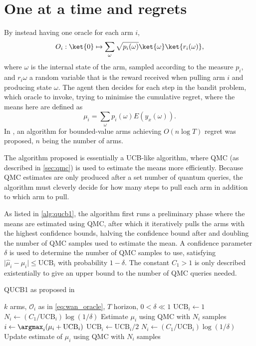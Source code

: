 \section{One at a time and regrets}
By instead having one oracle for each arm $i$,
\begin{equation}
    O_i: \ket{0} \mapsto \sum_\omega \sqrt{p_i(\omega)} \ket{\omega} \ket{r_i(\omega)},
    \label{eq:wan_oracle}
\end{equation}
where $\omega$ is the internal state of the arm, sampled according to the measure $p_i$, and $r_i{\omega}$ a random variable that is the reward received when pulling arm $i$ and producing state $\omega$.
The agent then decides for each step in the bandit problem, which oracle to invoke, trying to minimise the cumulative regret, where the means here are defined as
\begin{equation}
    \mu_i = \sum_\omega p_i(\omega) E(y_x(\omega)).
\end{equation}
In \cite{wan2022}, an algorithm for bounded-value arms achieving $O(n \log T)$ regret was proposed, $n$ being the number of arms.

The algorithm proposed is essentially a UCB-like algorithm, where QMC (as described in \cref{sec:qmc}) is used to estimate the means more efficiently.
Because QMC estimates are only produced after a set number of quantum queries, the algorithm must cleverly decide for how many steps to pull each arm in addition to which arm to pull.

As listed in \cref{alg:qucb1}, the algorithm first runs a preliminary phase where the means are estimated using QMC, after which it iteratively pulls the arms with the highest confidence bounds, halving the confidence bound after and doubling the number of QMC samples used to estimate the mean.
A confidence parameter $\delta$ is used to determine the number of QMC samples to use, satisfying $\lvert\hat{\mu}_i - \mu_i\rvert \leq \text{UCB}_i$ with probability $1-\delta$.
The constant $C_1>1$ is only described existentially to give an upper bound to the number of QMC queries needed.

\begin{algorithm}
    \caption{QUCB1 as proposed in \cite{wan2022}}
    \label{alg:qucb1}
    \begin{algorithmic}[1]
        \Require $k$ arms, $\mathcal{O}_i$ as in \cref{eq:wan_oracle}, $T$ horizon, $0 < \delta \ll 1$
        \State $\text{UCB}_i \gets 1$
        \State $N_i \gets (C_1/\text{UCB}_i) \log(1/\delta)$
        \State Estimate $\mu_i$ using QMC with $N_i$ samples
        \EndFor
        \State $i \gets \argmax_i (\mu_i + \text{UCB}_i)$
        \State $\text{UCB}_i \gets \text{UCB}_i /2$
        \State $N_i \gets (C_1/\text{UCB}_i) \log(1/\delta)$
        \State Update estimate of $\mu_i$ using QMC with $N_i$ samples
        \EndWhile
    \end{algorithmic}
\end{algorithm}
